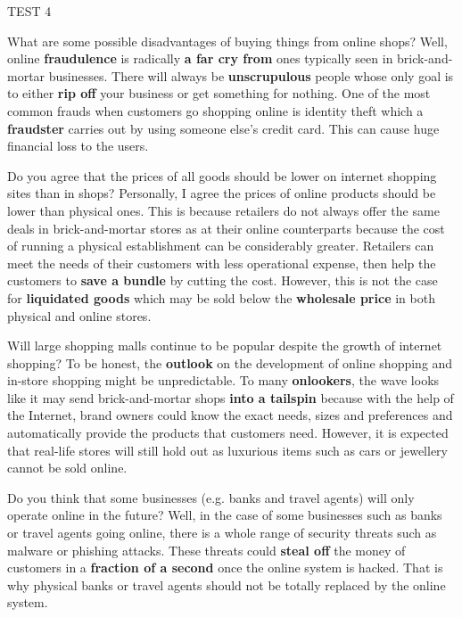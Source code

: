 \begin{glossarymc}[Cambridge 14]
\begin{test}{TEST 4}
    \begin{qa}{What are some possible disadvantages of buying things from online shops?}
    Well, online \textbf{fraudulence} is radically \textbf{a far cry from} ones typically seen in brick-and-mortar businesses. There will always be \textbf{unscrupulous} people whose only goal is to either \textbf{rip off} your business or get something for nothing. One of the most common frauds when customers go shopping online is identity theft which a \textbf{fraudster} carries out by using someone else’s credit card. This can cause huge financial loss to the users.
    \end{qa}

    \begin{qa}{Do you agree that the prices of all goods should be lower on internet shopping sites than in shops?}
    Personally, I agree the prices of online products should be lower than physical ones. This is because retailers do not always offer the same deals in brick-and-mortar stores as at their online counterparts because the cost of running a physical establishment can be considerably greater. Retailers can meet the needs of their customers with less operational expense, then help the customers to \textbf{save a bundle} by cutting the cost. However, this is not the case for \textbf{liquidated goods} which may be sold below the \textbf{wholesale price} in both physical and online stores.
    \end{qa}

    \begin{qa}{Will large shopping malls continue to be popular despite the growth of internet shopping?}
    To be honest, the \textbf{outlook} on the development of online shopping and in-store shopping might be unpredictable. To many \textbf{onlookers}, the wave looks like it may send brick-and-mortar shops \textbf{into a tailspin} because with the help of the Internet, brand owners could know the exact needs, sizes and preferences and automatically provide the products that customers need. However, it is expected that real-life stores will still hold out as luxurious items such as cars or jewellery cannot be sold online.
    \end{qa}

    \begin{qa}{Do you think that some businesses (e.g. banks and travel agents) will only operate online in the future?}
    Well, in the case of some businesses such as banks or travel agents going online, there is a whole range of security threats such as malware or phishing attacks. These threats could \textbf{steal off} the money of customers in a \textbf{fraction of a second} once the online system is hacked. That is why physical banks or travel agents should not be totally replaced by the online system.
    \end{qa}


\end{test}
\end{glossarymc}
